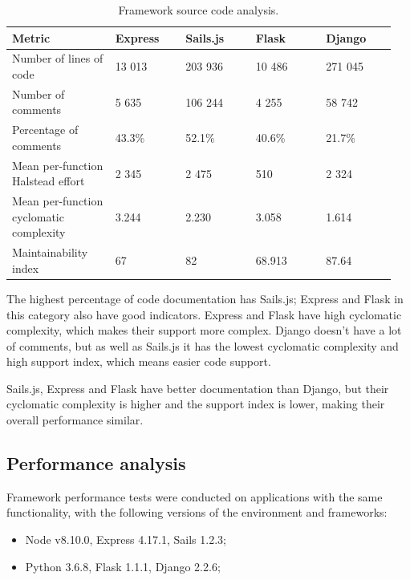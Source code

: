 \documentclass[runningheads]{llncs}
\begin{document}
\begin{table}
\caption{Framework source code analysis.}\label{tab2}
\begin{tabular}{|p{0.25\linewidth}|p{0.175\linewidth}|p{0.175\linewidth}|p{0.175\linewidth}|p{0.175\linewidth}|}
\hline
Metric &  Express  & Sails.js  & Flask    & Django\\
\hline
Number of lines of code & 13 013 & 203 936 & 10 486 & 271 045 \\
\hline
Number of comments & 5 635 & 106 244 & 4 255 & 58 742\\
\hline
Percentage of comments & 43.3\% & 52.1\% & 40.6\% & 21.7\%\\
\hline
Mean per-function Halstead effort & 2 345 & 2 475 & 510 & 2 324\\
\hline
Mean per-function cyclomatic complexity & 3.244 & 2.230 & 3.058 & 1.614\\
\hline
Maintainability index & 67 & 82 & 68.913 & 87.64\\
\hline
\end{tabular}
\end{table}

The highest percentage of code documentation has Sails.js; Express and Flask in this category also have good indicators. Express and Flask have high cyclomatic complexity, which makes their support more complex. Django doesn't have a lot of comments, but as well as Sails.js it has the lowest cyclomatic complexity and high support index, which means easier code support. 

Sails.js, Express and Flask have better documentation than Django, but their cyclomatic complexity is higher and the support index is lower, making their overall performance similar.



\subsection{Performance analysis}

Framework performance tests were conducted on applications with the same functionality, with the following versions of the environment and frameworks:

\begin{itemize}
	\item Node v8.10.0, Express 4.17.1, Sails 1.2.3;
	\item Python 3.6.8, Flask 1.1.1, Django 2.2.6; 
\end{itemize}
\end{document}

